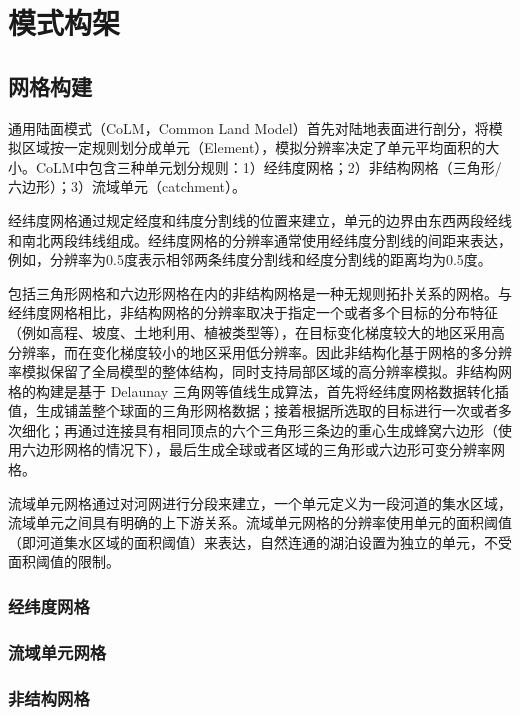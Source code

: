 \chapter{模式构架}\label{模式构架}
\section{网格构建}\label{网格构建}

通用陆面模式（CoLM，Common Land Model）首先对陆地表面进行剖分，将模拟区域按一定规则划分成单元（Element），模拟分辨率决定了单元平均面积的大小。CoLM中包含三种单元划分规则：1）经纬度网格；2）非结构网格（三角形/六边形）；3）流域单元（catchment）。

经纬度网格通过规定经度和纬度分割线的位置来建立，单元的边界由东西两段经线和南北两段纬线组成。经纬度网格的分辨率通常使用经纬度分割线的间距来表达，例如，分辨率为0.5度表示相邻两条纬度分割线和经度分割线的距离均为0.5度。


包括三角形网格和六边形网格在内的非结构网格是一种无规则拓扑关系的网格。与经纬度网格相比，非结构网格的分辨率取决于指定一个或者多个目标的分布特征（例如高程、坡度、土地利用、植被类型等），在目标变化梯度较大的地区采用高分辨率，而在变化梯度较小的地区采用低分辨率。因此非结构化基于网格的多分辨率模拟保留了全局模型的整体结构，同时支持局部区域的高分辨率模拟。非结构网格的构建是基于 Delaunay 三角网等值线生成算法，首先将经纬度网格数据转化插值，生成铺盖整个球面的三角形网格数据；接着根据所选取的目标进行一次或者多次细化；再通过连接具有相同顶点的六个三角形三条边的重心生成蜂窝六边形（使用六边形网格的情况下），最后生成全球或者区域的三角形或六边形可变分辨率网格。

流域单元网格通过对河网进行分段来建立，一个单元定义为一段河道的集水区域，流域单元之间具有明确的上下游关系。流域单元网格的分辨率使用单元的面积阈值（即河道集水区域的面积阈值）来表达，自然连通的湖泊设置为独立的单元，不受面积阈值的限制。
\subsection{经纬度网格}\label{经纬度网格}

\subsection{流域单元网格}\label{流域单元网格}

\subsection{非结构网格}\label{非结构网格}

